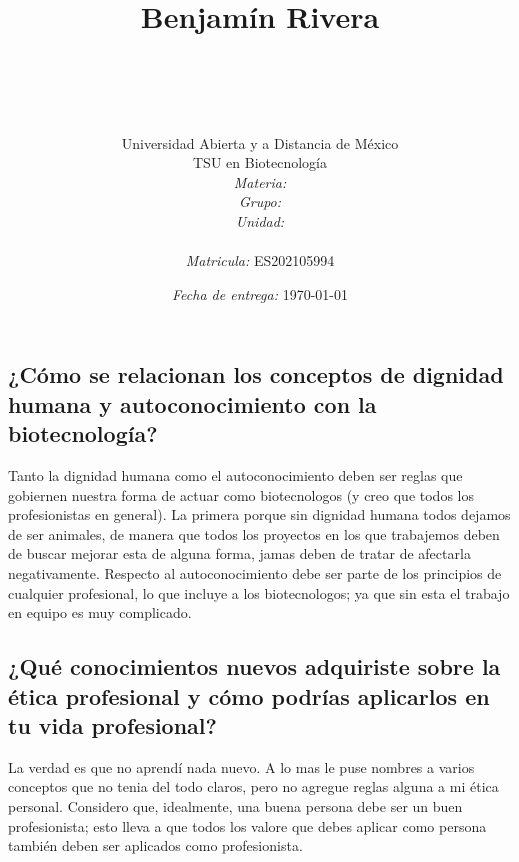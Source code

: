 \documentclass[12pt]{article}
\title{
	\ \\ Benjam\'in Rivera \\
	\bf{\titulo}\\\ \\}
\author{
	{\Huge Universidad Abierta y a Distancia de México} \\
	TSU en Biotecnolog\'ia \\
	\textit{Materia:} \materia \\
	\textit{Grupo:} \grupo \\
	\textit{Unidad:} \unidad \\
	\\
	\textit{Matricula:} ES202105994 }
\date{\textit{Fecha de entrega:} \today}
\begin{document}
\maketitle\newpage

\subsection*{¿Cómo se relacionan los conceptos de dignidad humana y autoconocimiento con la biotecnología?}

\par Tanto la dignidad humana como el autoconocimiento deben ser reglas que gobiernen nuestra forma de actuar como biotecnologos (y creo que todos los profesionistas en general). La primera porque sin dignidad humana todos dejamos de ser animales, de manera que todos los proyectos en los que trabajemos deben de buscar mejorar esta de alguna forma, jamas deben de tratar de afectarla negativamente. Respecto al autoconocimiento debe ser parte de los principios de cualquier profesional, lo que incluye a los biotecnologos; ya que sin esta el trabajo en equipo es muy complicado.

\subsection*{¿Qué conocimientos nuevos adquiriste sobre la ética profesional y cómo podrías aplicarlos en tu vida profesional?}

 La verdad es que no aprendí nada nuevo. A lo mas le puse nombres a varios conceptos que no tenia del todo claros, pero no agregue reglas alguna a mi ética personal. Considero que, idealmente, una buena persona debe ser un buen profesionista; esto lleva a que todos los valore que debes aplicar como persona también deben ser aplicados como profesionista.




\end{document}
